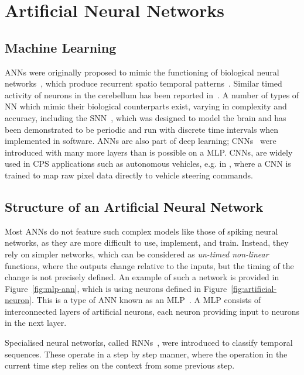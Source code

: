 \section{Artificial Neural Networks}
\subsection{Machine Learning}
\acp{ANN} were originally proposed to mimic the functioning of  biological neural networks~\cite{kohonen1988introduction}, which produce recurrent spatio temporal patterns~\cite{rolston2007precisely}. 
Similar timed activity of neurons in the cerebellum has been reported in~\cite{bullock1994neural, moore1989adaptively}. 
A number of types of \ac{NN} which mimic their biological counterparts exist, varying in complexity and accuracy, including the \ac{SNN}~\cite{izhikevich2003spiking,maass1997spiking}, which was designed to model the brain and has been demonstrated to be periodic and run with discrete time intervals when implemented in software. 
\acp{ANN} are also part of deep learning; \acfp{CNN}~\cite{schmidhuber2015deep} were introduced with many more layers than is possible on a \ac{MLP}. 
\acp{CNN}, are widely used in \ac{CPS} applications such as autonomous vehicles, e.g. in \cite{EndToEndLearningForSelfDrivingCars}, where a \ac{CNN} is trained to map raw pixel data directly to vehicle steering commands.

\subsection{Structure of an Artificial Neural Network}
Most \acp{ANN} do not feature such complex models like those of spiking neural networks, as they are more difficult to use, implement, and train. 
Instead, they rely on simpler networks, which can be considered as \emph{un-timed non-linear} functions, where the outputs change relative to the inputs, but the timing of the change is not precisely defined. 
An example of such a network is provided in Figure~\ref{fig:mlp-ann}, which is using neurons defined in Figure~\ref{fig:artificial-neuron}. 
This is a type of \ac{ANN} known as an \acf{MLP}~\cite{yegnanarayana1994artificial}.
A \ac{MLP} consists of interconnected layers of artificial neurons, each neuron providing input to neurons in the next layer.

Specialised neural networks, called \acfp{RNN}~\cite{medsker2001recurrent}, were introduced to classify temporal sequences. 
These operate in a step by step manner, where the operation in the current time step relies on the context from some previous step.

